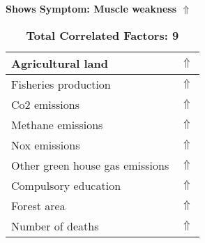 \documentclass[12pt,notitlepage,oneside]{report}
\begin{document}
\begin{table}[!htb]
\caption{\textbf{Shows Symptom: Muscle weakness $\Uparrow$}}
\centering
\label{Correlated Socio-economic Factors0}
\begin{tabular}{|l|l|}
\hline
Agricultural land & $\Uparrow$\\ \hline
Fisheries production & $\Uparrow$\\ \hline
Co2 emissions & $\Uparrow$\\ \hline
Methane emissions & $\Uparrow$\\ \hline
Nox emissions & $\Uparrow$\\ \hline
Other green house gas emissions & $\Uparrow$\\ \hline
Compulsory education & $\Uparrow$\\ \hline
Forest area & $\Uparrow$\\ \hline
Number of deaths & $\Uparrow$\\ \hline
\end{tabular}
\caption*{\textbf{Total Correlated Factors: 9}}
\end{table}
\end{document}
